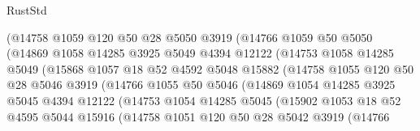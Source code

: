 \begin{lexlean}{RustStd}
\begin{coremodule}
                      (@14758
                        @1059
                        @120
                        @50
                        @28
                        @5050
                        @3919
                        (@14766
                          @1059
                          @50
                          @5050
                          (@14869
                            @1058
                            @14285
                            @3925
                            @5049
                            @4394
                            @12122
                            (@14753
                              @1058
                              @14285
                              @5049
                              (@15868
                                @1057
                                @18
                                @52
                                @4592
                                @5048
                                @15882
                                (@14758
                                  @1055
                                  @120
                                  @50
                                  @28
                                  @5046
                                  @3919
                                  (@14766
                                    @1055
                                    @50
                                    @5046
                                    (@14869
                                      @1054
                                      @14285
                                      @3925
                                      @5045
                                      @4394
                                      @12122
                                      (@14753
                                        @1054
                                        @14285
                                        @5045
                                        (@15902
                                          @1053
                                          @18
                                          @52
                                          @4595
                                          @5044
                                          @15916
                                          (@14758
                                            @1051
                                            @120
                                            @50
                                            @28
                                            @5042
                                            @3919
                                            (@14766

\end{coremodule}
\end{lexlean}
